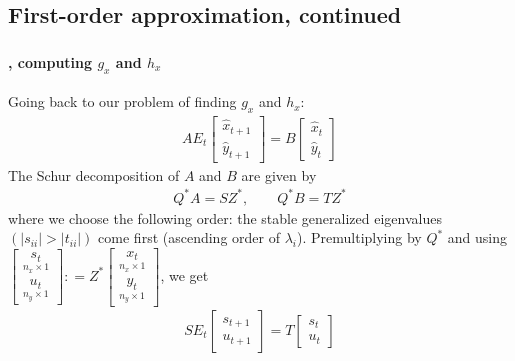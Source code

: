 \documentclass[handout]{beamer}  %
\begin{document}
\subsection{First-order approximation, continued}
\begin{frame}
\frametitle{\secname}\framesubtitle{\subsecname, computing $g_x$ and $h_x$}
Going back to our problem of finding $g_x$ and $h_x$:
  \begin{eqnarray*}
    A E_t \begin{bmatrix} \widehat{x}_{t+1} \\ \widehat{y}_{t+1} \end{bmatrix} = B\begin{bmatrix} \widehat{x}_t\\ \widehat{y}_t \end{bmatrix}
  \end{eqnarray*}
The Schur decomposition of $A$ and $B$ are given by
\begin{align*}
  Q^* A = S Z^*,\qquad   Q^* B = T Z^*
\end{align*}
where we choose the following order: the stable generalized eigenvalues $(|s_{ii}|>|t_{ii}|)$ come first (ascending order of $\lambda_i$). Premultiplying by $Q^*$ and using
$\begin{bmatrix} \underset{n_x \times 1}{s_t} \\ \underset{n_y\times1}{u_t} \end{bmatrix} : = Z^* \begin{bmatrix} \underset{n_x \times 1}{x_t} \\ \underset{n_y \times 1}{y_t} \end{bmatrix}$, we get
\begin{align*}
  S E_t \begin{bmatrix} s_{t+1}\\ u_{t+1} \end{bmatrix} = T \begin{bmatrix} s_t \\ u_t \end{bmatrix}
\end{align*}
\end{frame}
\end{document}
